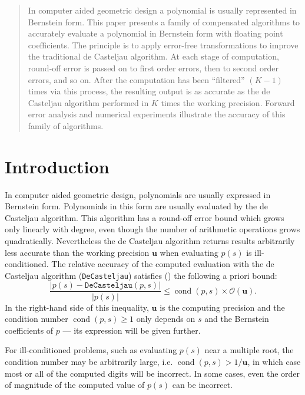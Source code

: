 \documentclass[letterpaper,10pt]{article}
\newcommand{\cond}[1]{\operatorname{cond}\left(#1\right)}
\newcommand{\mach}{\mathbf{u}}
\begin{document}
\begin{abstract}
In computer aided geometric design a polynomial is usually represented in
Bernstein form. This paper presents a family of compensated algorithms to
accurately evaluate a polynomial in Bernstein form with floating point
coefficients. The principle is to apply error-free transformations to
improve the traditional de Casteljau algorithm. At each stage of computation,
round-off error is passed on to first order errors, then to second order
errors, and so on. After the computation has been ``filtered'' \((K - 1)\)
times via this process, the resulting output is as accurate as the de Casteljau
algorithm performed in \(K\) times the working precision. Forward error
analysis and numerical experiments illustrate the accuracy of this family
of algorithms.
\end{abstract}

\tableofcontents

\section{Introduction}

In computer aided geometric design, polynomials are usually expressed in
Bernstein form. Polynomials in this form are usually evaluated by the
de Casteljau algorithm. This algorithm has a round-off error bound
which grows only linearly with degree, even though the number of
arithmetic operations grows quadratically. Nevertheless the de Casteljau
algorithm returns results arbitrarily less accurate than the working
precision \(\mach\) when evaluating \(p(s)\) is ill-conditioned.
The relative accuracy of the computed
evaluation with the de Casteljau algorithm (\texttt{DeCasteljau}) satisfies
(\cite{Mainar1999}) the following a priori bound:
\begin{equation}\label{de-casteljau-error}
  \frac{\left|p(s) - \mathtt{DeCasteljau}(p, s)\right|}{\left|p(s)\right|} \leq
  \cond{p, s} \times \mathcal{O}(\mach).
\end{equation}
In the right-hand side of this inequality, \(\mach\) is the computing
precision and the condition number \(\cond{p, s} \geq 1\) only depends
on \(s\) and the Bernstein coefficients of \(p\) --- its expression will
be given further.

For ill-conditioned problems, such as evaluating \(p(s)\) near a
multiple root, the condition number may be arbitrarily large, i.e.
\(\cond{p, s} > 1 / \mach\), in
which case most or all of the computed digits will be incorrect.
In some cases, even the order of magnitude of the computed value
of \(p(s)\) can be incorrect.
\end{document}
